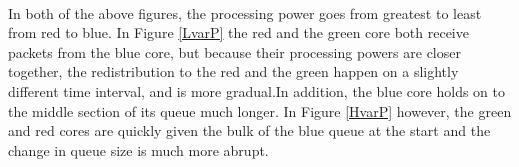 \documentclass{article}
\begin{document}
\\
In both of the above figures, the processing power goes from greatest to least from red to blue. In Figure \ref{LvarP} the red and the green core both receive packets from the blue core, but because their processing powers are closer together, the redistribution to the red and the green happen on a slightly different time interval, and is more gradual.In addition, the blue core holds on to the middle section of its queue much longer. In Figure \ref{HvarP} however, the green and red cores are quickly given the bulk of the blue queue at the start and the change in queue size is much more abrupt. 
\end{document}
